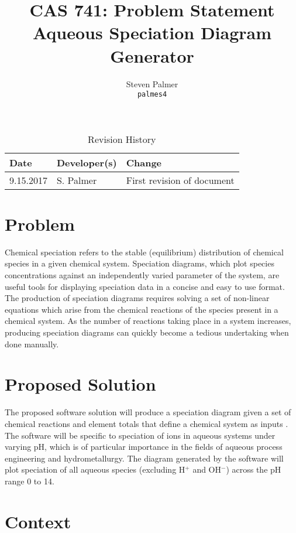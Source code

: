\documentclass{article}
\title{CAS 741: Problem Statement\\[10pt]\Large Aqueous Speciation Diagram Generator}
\author{Steven Palmer\\\texttt{palmes4}}
\date{}
\begin{document}

\maketitle

\begin{table}[hp]
\caption{Revision History} \label{TblRevisionHistory}
\begin{tabularx}{\textwidth}{llX}
\toprule
\textbf{Date} & \textbf{Developer(s)} & \textbf{Change}\\
\midrule
9.15.2017 & S. Palmer & First revision of document\\
\bottomrule
\end{tabularx}
\end{table}

\section*{Problem}
Chemical speciation refers to the stable (equilibrium) distribution of chemical species in a given chemical system.   Speciation diagrams, which plot species concentrations against an independently varied parameter of the system, are useful tools for displaying speciation data in a concise and easy to use format.  The production of speciation diagrams requires solving a set of non-linear equations which arise from the chemical reactions of the species present in a chemical system.  As the number of reactions taking place in a system increases, producing speciation diagrams can quickly become a tedious undertaking when done manually.

\section*{Proposed Solution}
The proposed software solution will produce a speciation diagram given a set of chemical reactions and element totals that define a chemical system as inputs .  The software will be specific to speciation of ions in aqueous systems under varying pH, which is of particular importance in the fields of aqueous process engineering and hydrometallurgy.  The diagram generated by the software will plot speciation of all aqueous species (excluding H$^+$ and OH$^-$) across the pH range 0 to 14.

\section*{Context}
\end{document}
